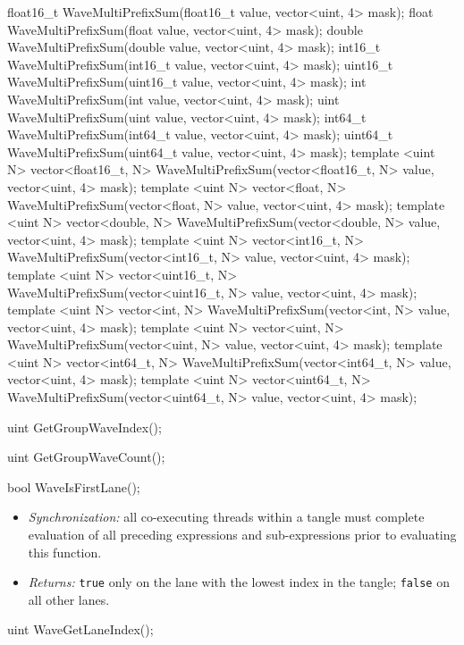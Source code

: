 \begin{HLSL}
float16_t WaveMultiPrefixSum(float16_t value, vector<uint, 4> mask);
float WaveMultiPrefixSum(float value, vector<uint, 4> mask);
double WaveMultiPrefixSum(double value, vector<uint, 4> mask);
int16_t WaveMultiPrefixSum(int16_t value, vector<uint, 4> mask);
uint16_t WaveMultiPrefixSum(uint16_t value, vector<uint, 4> mask);
int WaveMultiPrefixSum(int value, vector<uint, 4> mask);
uint WaveMultiPrefixSum(uint value, vector<uint, 4> mask);
int64_t WaveMultiPrefixSum(int64_t value, vector<uint, 4> mask);
uint64_t WaveMultiPrefixSum(uint64_t value, vector<uint, 4> mask);
template <uint N>
vector<float16_t, N> WaveMultiPrefixSum(vector<float16_t, N> value, vector<uint, 4> mask);
template <uint N>
vector<float, N> WaveMultiPrefixSum(vector<float, N> value, vector<uint, 4> mask);
template <uint N>
vector<double, N> WaveMultiPrefixSum(vector<double, N> value, vector<uint, 4> mask);
template <uint N>
vector<int16_t, N> WaveMultiPrefixSum(vector<int16_t, N> value, vector<uint, 4> mask);
template <uint N>
vector<uint16_t, N> WaveMultiPrefixSum(vector<uint16_t, N> value, vector<uint, 4> mask);
template <uint N>
vector<int, N> WaveMultiPrefixSum(vector<int, N> value, vector<uint, 4> mask);
template <uint N>
vector<uint, N> WaveMultiPrefixSum(vector<uint, N> value, vector<uint, 4> mask);
template <uint N>
vector<int64_t, N> WaveMultiPrefixSum(vector<int64_t, N> value, vector<uint, 4> mask);
template <uint N>
vector<uint64_t, N> WaveMultiPrefixSum(vector<uint64_t, N> value, vector<uint, 4> mask);

uint GetGroupWaveIndex();

uint GetGroupWaveCount();
\end{HLSL}


\begin{HLSL}
bool WaveIsFirstLane();
\end{HLSL}

\begin{itemize}
  \item \textit{Synchronization:} all co-executing threads within a \gls{tangle}
  must complete evaluation of all preceding expressions and sub-expressions
  prior to evaluating this function.
  \item \textit{Returns:} \texttt{true} only on the \gls{lane} with the
  lowest index in the \gls{tangle}; \texttt{false} on all other lanes.
\end{itemize}

\begin{HLSL}
uint WaveGetLaneIndex();
\end{HLSL}

